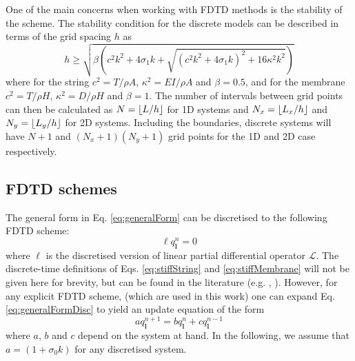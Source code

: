 \documentclass{article}
\begin{document}
One of the main concerns when working with FDTD methods is the stability of the scheme. The stability condition for the discrete models can be described in terms of the grid spacing $h$ as \cite{WillemsenThesis}
\begin{equation}\label{eq:stability}
    h\geq \sqrt{\beta\left(c^2k^2 + 4 \sigma_1k+\sqrt{(c^2k^2 + 4 \sigma_1k)^2 + 16 \kappa^2k^2}\right)}
\end{equation}
where for the string $c^2 = T/\rho A$, $\kappa^2 = EI/\rho A$ and $\beta = 0.5$, and for the membrane $c^2 = T / \rho H$, $\kappa^2 = D/\rho H$ and $\beta = 1$. The number of intervals between grid points can then be calculated as $N = \floor[L/h]$ for 1D systems and $N_x = \floor[L_x/h]$ and $N_y = \floor[L_y/h]$ for 2D systems. Including the boundaries, discrete systems will have $N+1$ and $(N_x+1)(N_y+1)$ grid points for the 1D and 2D case respectively. 


\subsection{FDTD schemes}
The general form in Eq. \eqref{eq:generalForm} can be discretised to the following FDTD scheme:
\begin{equation}\label{eq:generalFormDisc}
    \ell q_{\boldsymbol{l}}^n = 0
\end{equation}
where $\ell$ is the discretised version of linear partial differential operator $\mathcal{L}$. The discrete-time definitions of Eqs. \eqref{eq:stiffString} and \eqref{eq:stiffMembrane} will not be given here for brevity, but can be found in the literature (e.g. \cite{theBible}, \cite{WillemsenThesis}). However, for any explicit FDTD scheme, (which are used in this work) one can expand Eq.  \eqref{eq:generalFormDisc} to yield an update equation of the form
\begin{equation}\label{eq:generalUpdate}
    a q_{\boldsymbol{l}}^{n+1} = b q_{\boldsymbol{l}}^n + c q_{\boldsymbol{l}}^{n-1}
\end{equation}
where $a$, $b$ and $c$ depend on the system at hand. In the following, we assume that $a = (1+\sigma_0 k)$ for any discretised system.

\end{document}
